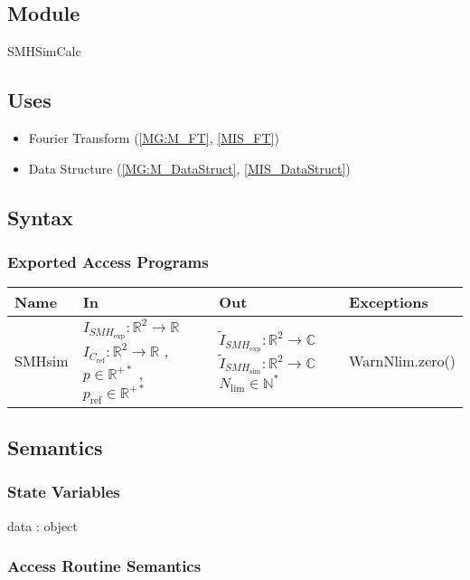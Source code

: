 \documentclass[12pt, titlepage]{article}
\begin{document}
\subsection{Module}
SMHSimCalc
\subsection{Uses}
\begin{itemize}
\item Fourier Transform (\cref{MG:M_FT}, \cref{MIS_FT})
\item Data Structure (\cref{MG:M_DataStruct}, \cref{MIS_DataStruct})
\end{itemize}

\subsection{Syntax}

\subsubsection{Exported Access Programs}

\begin{center}
\begin{tabular}{p{2cm} p{4cm} p{4cm} p{2cm}}
\hline
\textbf{Name} & \textbf{In} & \textbf{Out} & \textbf{Exceptions} \\
\hline
SMHsim & $I_{\mathit{SMH}_{\text{exp}}}:\mathbb{R}^2\rightarrow\mathbb{R} $ $ I_{C_{\text{ref}}}:\mathbb{R}^2\rightarrow\mathbb{R}$ , $p \in \mathbb{R}^{+*}$ , $p_{\text{ref}} \in \mathbb{R}^{+*}$ & $\widetilde{I}_{\mathit{SMH}_{\text{exp}}}:\mathbb{R}^2\rightarrow\mathbb{C}$ $\widetilde{I}_{\mathit{SMH}_{\text{sim}}}:\mathbb{R}^2\rightarrow\mathbb{C}$ $N_{\text{lim}} \in \mathbb{N}^{*}$ & WarnNlim.zero() \\
\hline
\end{tabular}
\end{center}

\subsection{Semantics}

\subsubsection{State Variables}

data : object

\subsubsection{Access Routine Semantics}
\end{document}

